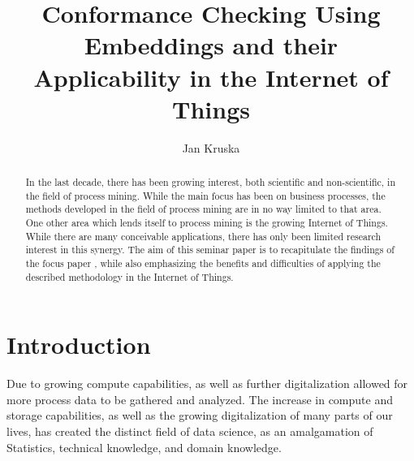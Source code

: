 \documentclass[runningheads]{template/llncs}
\begin{document}
	\title{Conformance Checking Using Embeddings and their Applicability in the Internet of Things}
	\author{Jan Kruska}
%
\maketitle              %
%
%
%
%

\begin{abstract}
	In the last decade, there has been growing interest, both scientific and non-scientific, in the field of process mining.
	While the main focus has been on business processes, the methods developed in the field of process mining are in no way limited to that area.
	One other area which lends itself to process mining is the growing Internet of Things.
	While there are many conceivable applications,  there has only been limited research interest in this synergy.
	The aim of this seminar paper is to recapitulate the findings of the focus paper \cite{PBWe20}, while also emphasizing the benefits and difficulties of applying the described methodology in the Internet of Things.
\end{abstract}

\section{Introduction}

Due to growing compute capabilities, as well as further digitalization allowed for more process data to be gathered and analyzed.
The increase in compute and storage capabilities, as well as the growing digitalization of many parts of our lives, has created the distinct field of data science, as an amalgamation of Statistics, technical knowledge, and domain knowledge.
\end{document}

